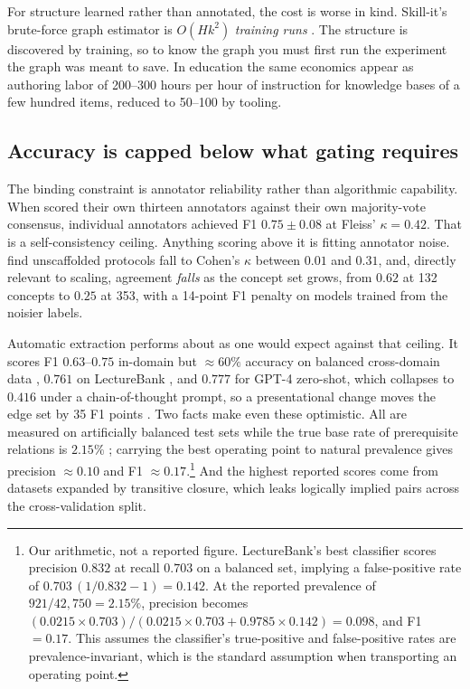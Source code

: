 \documentclass[11pt]{article}
\theoremstyle{plain}
\theoremstyle{definition}
\theoremstyle{remark}
\begin{document}
For structure learned rather than annotated, the cost is worse in kind.
Skill-it's brute-force graph estimator is $O(Hk^2)$ \emph{training runs}
\citep{chen2023skillit}. The structure is discovered by training, so to know the
graph you must first run the experiment the graph was meant to save. In education
the same economics appear as authoring labor of 200--300 hours per hour of
instruction \citep{aleven2010rule} for knowledge bases of a few hundred items,
reduced to 50--100 by tooling.

\subsection{Accuracy is capped below what gating requires}

The binding constraint is annotator reliability rather than algorithmic
capability. When \citet{liang2017recovering} scored their
own thirteen annotators against their own majority-vote consensus, individual
annotators achieved F1 $0.75 \pm 0.08$ at Fleiss' $\kappa = 0.42$. That is a
self-consistency ceiling. Anything scoring above it is fitting annotator noise.
\citet{alzetta2023annotation} find unscaffolded protocols fall to Cohen's $\kappa$
between $0.01$ and $0.31$, and, directly relevant to scaling, agreement
\emph{falls} as the concept set grows, from $0.62$ at 132 concepts to $0.25$ at
353, with a 14-point F1 penalty on models trained from the noisier labels.

Automatic extraction performs about as one would expect against that ceiling. It
scores F1 $0.63$--$0.75$ in-domain but ${\approx}60\%$ accuracy on balanced
cross-domain data \citep{liang2015measuring}, $0.761$ on LectureBank \citep{li2019lecturebank},
and $0.777$ for GPT-4 zero-shot, which collapses to $0.416$ under a
chain-of-thought prompt, so a presentational change moves the edge set by 35 F1
points \citep{yang2024cgprompt}. Two facts make even these optimistic. All are
measured on artificially balanced test sets while the true base rate of
prerequisite relations is $2.15\%$ \citep{li2019lecturebank}; carrying the best
operating point to natural prevalence gives precision ${\approx}0.10$ and F1
${\approx}0.17$.\footnote{Our arithmetic, not a reported figure. LectureBank's
best classifier scores precision $0.832$ at recall $0.703$ on a balanced set,
implying a false-positive rate of $0.703\,(1/0.832 - 1) = 0.142$. At the reported
prevalence of $921/42{,}750 = 2.15\%$, precision becomes $(0.0215 \times 0.703) /
(0.0215 \times 0.703 + 0.9785 \times 0.142) = 0.098$, and F1 $= 0.17$. This
assumes the classifier's true-positive and false-positive rates are
prevalence-invariant, which is the standard assumption when transporting an
operating point.} And the highest reported scores come from datasets expanded by
transitive closure, which leaks logically implied pairs across the
cross-validation split.
\end{document}
